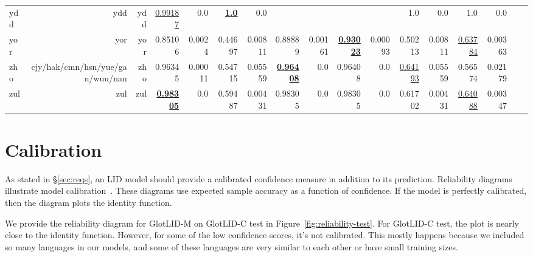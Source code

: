 \documentclass[11pt]{article}
\def\modelname{\mbox{GlotLID-M}\xspace}
\def\corpusname{\mbox{GlotLID-C}\xspace}
\def\udhr{UDHR\xspace}
\def\nllb{NLLB\xspace}
\def\figref#1{Figure~\ref{fig:#1}}
\def\seclabel#1{\label{sec:#1}\label{p:#1}}
\def\secref#1{\S\ref{sec:#1}}
\begin{document}
\begin{table*}[h]
{\begin{tabular}{lrrrrrrrrrrrrrrrr}
ydd         & ydd         & ydd         & \underline{0.99187}         & 0.0         & \textbf{\underline{1.0}}         & 0.0         &         &         &         &         & 1.0         & 0.0         & 1.0         & 0.0         \\
yor         & yor         & yor         & 0.85106         & 0.0024         & 0.44697         & 0.00811         & 0.88889         & 0.00161         & \textbf{\underline{0.93023}}         & 0.00093         & 0.50213         & 0.00811         & \underline{0.63784}         & 0.00363         \\
zho         & cjy/hak/cmn/hsn/yue/gan/wuu/nan         & zho         & 0.96345         & 0.00011         & 0.54715         & 0.05559         & \textbf{\underline{0.96408}}         & 0.0         & 0.96408         & 0.0         & \underline{0.64193}         & 0.05559         & 0.56574         & 0.02179         \\
zul         & zul         & zul         & \textbf{\underline{0.98305}}         & 0.0         & 0.59487         & 0.00431         & 0.98305         & 0.0         & 0.98305         & 0.0         & 0.61702         & 0.00431         & \underline{0.64088}         & 0.00347         \\
\end{tabular}
}
\caption{Comparison of GlotLID vs \nllb on \udhr benchmark (part 2)}
\label{tab:appendix_glotlid_nllb_udhr_2}
\end{table*}
 

\section{Calibration}\seclabel{calibration}

As stated in \secref{reqs}, an LID model should provide a calibrated confidence measure in addition to its prediction. Reliability diagrams illustrate model calibration~\citep{degroot1983comparison, niculescu2005predicting}. These diagrams use expected sample accuracy as a function of confidence. If the model is perfectly calibrated, then the diagram plots the identity function.

We provide the reliability diagram for \modelname on \corpusname test in \figref{reliability-test}.
For \corpusname test, the plot is nearly close to the identity function. However, for some of the low confidence scores, it's not calibrated. This mostly happens because we included so many languages in our models, and some of these languages are very similar to each other or have small training sizes.
\end{document}
